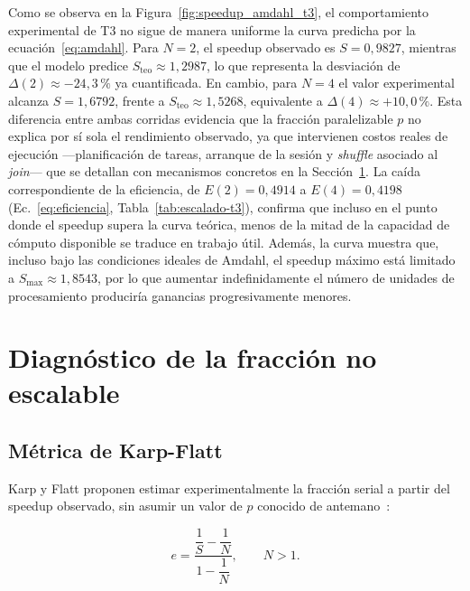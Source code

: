 \documentclass[11pt,a4paper]{article}
\begin{document}
    Como se observa en la Figura~\ref{fig:speedup_amdahl_t3}, el
    comportamiento experimental de T3 no sigue de manera uniforme la
    curva predicha por la ecuación~\eqref{eq:amdahl}. Para $N=2$, el
    speedup observado es $S=0{,}9827$, mientras que el modelo predice
    $S_{\text{teo}} \approx 1{,}2987$, lo que representa la desviación de
    $\Delta(2) \approx -24{,}3\,\si{\percent}$ ya cuantificada. En
    cambio, para $N=4$ el valor experimental alcanza $S=1{,}6792$, frente
    a $S_{\text{teo}} \approx 1{,}5268$, equivalente a
    $\Delta(4) \approx +10{,}0\,\si{\percent}$. Esta diferencia entre
    ambas corridas evidencia que la fracción paralelizable $p$ no explica
    por sí sola el rendimiento observado, ya que intervienen costos reales
    de ejecución —planificación de tareas, arranque de la sesión y
    \emph{shuffle} asociado al \emph{join}— que se detallan con mecanismos
    concretos en la Sección~\ref{sec:diagnostico}. La caída correspondiente
    de la eficiencia, de $E(2) = 0{,}4914$ a $E(4) = 0{,}4198$
    (Ec.~\ref{eq:eficiencia}, Tabla~\ref{tab:escalado-t3}), confirma que
    incluso en el punto donde el speedup supera la curva teórica, menos de
    la mitad de la capacidad de cómputo disponible se traduce en trabajo
    útil. Además, la curva muestra que, incluso bajo las condiciones
    ideales de Amdahl, el speedup máximo está limitado a
    $S_{\max} \approx 1{,}8543$, por lo que aumentar indefinidamente el
    número de unidades de procesamiento produciría ganancias
    progresivamente menores.


    \section{Diagnóstico de la fracción no escalable}
    \label{sec:diagnostico}

    \subsection{Métrica de Karp-Flatt}

    Karp y Flatt proponen estimar experimentalmente la fracción serial a
    partir del speedup observado, sin asumir un valor de $p$ conocido de
    antemano~\cite{karpflatt1990}:

    \begin{equation}
        e = \frac{\dfrac{1}{S} - \dfrac{1}{N}}{1 - \dfrac{1}{N}}, \qquad N > 1.
        \label{eq:karpflatt}
    \end{equation}
\end{document}

